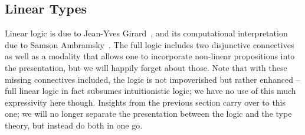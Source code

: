 \subsection{Linear Types}
Linear logic is due to Jean-Yves Girard~\cite{girard1987linear}, and its computational interpretation due to Samson Ambramsky~\cite{abramsky1993computational}.
The full logic includes two disjunctive connectives as well as a modality that allows one to incorporate non-linear propositions into the presentation, but we will happily forget about those.
Note that with these missing connectives included, the logic is not impoverished but rather enhanced -- full linear logic in fact subsumes intuitionistic logic; we have no use of this much expressivity here though.
Insights from the previous section carry over to this one; we will no longer separate the presentation between the logic and the type theory, but instead do both in one go.

